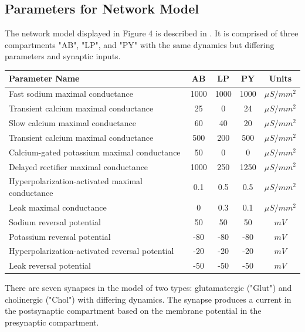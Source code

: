 \documentclass[utf8]{frontiers_suppmat} %
\begin{document}
	\subsection{Parameters for Network Model}
		The network model displayed in Figure 4 is described in \cite{prinzAlternativeHandtuningConductancebased2003, prinzSimilarNetworkActivity2004}. It is comprised of three compartments "AB", "LP", and "PY" with the same dynamics but differing parameters and synaptic inputs.
		
		\begin{center}
			\begin{tabular}{|l|c|c|c|c|}
				\hline 
				\textbf{Parameter Name} & \textbf{AB} & \textbf{LP} & \textbf{PY} & \textbf{Units} \\ 
				\hline 
				Fast sodium maximal conductance & 1000 & 1000 & 1000 & $\mu S/mm^2$ \\ 
				\hline 
				Transient calcium maximal conductance & 25 & 0 & 24 & $\mu S/mm^2$ \\  
				\hline 
				Slow calcium maximal conductance & 60 & 40 & 20 & $\mu S/mm^2$ \\  
				\hline 
				Transient calcium maximal conductance & 500 & 200 & 500 & $\mu S/mm^2$ \\  
				\hline 
				Calcium-gated potassium maximal conductance & 50 & 0 & 0 & $\mu S/mm^2$ \\  
				\hline 
				Delayed rectifier maximal conductance & 1000 & 250 & 1250 & $\mu S/mm^2$ \\  
				\hline 
				Hyperpolarization-activated maximal conductance & 0.1 & 0.5 & 0.5 & $\mu S/mm^2$ \\  
				\hline 
				Leak maximal conductance & 0 & 0.3 & 0.1 & $\mu S/mm^2$ \\  
				\hline 
				Sodium reversal potential & 50 & 50 & 50 & $mV$ \\ 
				\hline 
				Potassium reversal potential & -80 & -80 & -80 & $mV$ \\ 
				\hline
				Hyperpolarization-activated reversal potential & -20 & -20 & -20 & $mV$ \\
				\hline
				Leak reversal potential & -50 & -50 & -50 & $mV$ \\
				\hline
			\end{tabular}
		\end{center}
	
		There are seven synapses in the model of two types: glutamatergic ("Glut") and cholinergic ("Chol") with differing dynamics. The synapse produces a current in the postsynaptic compartment based on the membrane potential in the presynaptic compartment. 
		
\end{document}
